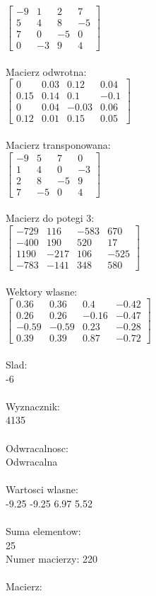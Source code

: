 \documentclass[a4paper,12pt]{article}
\begin{document}
$\begin{bmatrix} -9&1&2&7\\5&4&8&-5\\7&0&-5&0\\0&-3&9&4 \end{bmatrix}$
\\
\\
Macierz odwrotna:\\

$\begin{bmatrix} 0&0.03&0.12&0.04\\0.15&0.14&0.1&-0.1\\0&0.04&-0.03&0.06\\0.12&0.01&0.15&0.05 \end{bmatrix}$
\\
\\
Macierz transponowana:\\

$\begin{bmatrix} -9&5&7&0\\1&4&0&-3\\2&8&-5&9\\7&-5&0&4 \end{bmatrix}$
\\
\\
Macierz do potegi 3:\\

$\begin{bmatrix} -729&116&-583&670\\-400&190&520&17\\1190&-217&106&-525\\-783&-141&348&580 \end{bmatrix}$
\\
\\
Wektory wlasne:\\

$\begin{bmatrix} 0.36&0.36&0.4&-0.42\\0.26&0.26&-0.16&-0.47\\-0.59&-0.59&0.23&-0.28\\0.39&0.39&0.87&-0.72 \end{bmatrix}$
\\
\\
Slad:\\
-6
\\
\\
Wyznacznik:\\
4135
\\
\\
Odwracalnosc:\\
Odwracalna
\\
\\
Wartosci wlasne:\\
-9.25 -9.25 6.97 5.52
\\
\\
Suma elementow:\\
25
\\
\newpage
Numer macierzy:
220
\\
\\
Macierz:\\
\end{document}

